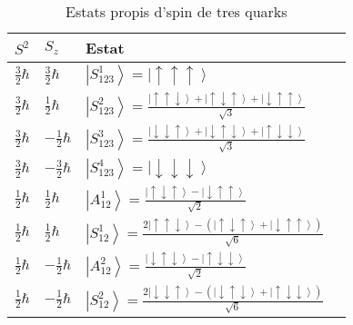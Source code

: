 \documentclass[12pt]{article}
\numberwithin{table}{section}
\numberwithin{figure}{section}
\numberwithin{equation}{section}
\renewcommand{\up}{\uparrow}
\newcommand{\down}{\downarrow}
\newcommand{\ket}[1]{\left\vert {#1} \right\rangle}
\begin{document}
\begin{table}[htb]
	\centering \sffamily \small
	\caption{Estats propis d'spin de tres quarks}
	\label{tab:estats d'spin}
	\begin{tabular}{@{}llll@{}}
		\toprule
		\( S^2 \) & \( S_z \) & Estat \\
		\midrule	
		\( \tfrac{3}{2}\hbar \) & \( \tfrac{3}{2}\hbar \) & \( \ket{S_{123}^1} = \ket{\up\up\up} \) \\
		\( \tfrac{3}{2}\hbar \) & \( \tfrac{1}{2}\hbar \) & \( \ket{S_{123}^2} = \frac{\ket{\up\up\down} + \ket{\up\down\up} + \ket{\down\up\up}}{\sqrt{3}} \) \\
		\( \tfrac{3}{2}\hbar \) & \( -\tfrac{1}{2}\hbar \) & \( \ket{S_{123}^3} = \frac{\ket{\down\down\up} + \ket{\down\up\down} + \ket{\up\down\down}}{\sqrt{3}} \) \\
		\( \tfrac{3}{2}\hbar \) & \( -\tfrac{3}{2}\hbar \) & \( \ket{S_{123}^4} = \ket{\down\down\down} \) \\
		\( \tfrac{1}{2}\hbar \) & \( \tfrac{1}{2}\hbar \) & \( \ket{A_{12}^1} = \frac{\ket{\up\down\up} - \ket{\down\up\up}}{\sqrt{2}} \) \\
		\( \tfrac{1}{2}\hbar \) & \( \tfrac{1}{2}\hbar \) & \( \ket{S_{12}^1} = \frac{2\ket{\up\up\down} - (\ket{\up\down\up} + \ket{\down\up\up})}{\sqrt{6}} \) \\
		\( \tfrac{1}{2}\hbar \) & \( -\tfrac{1}{2}\hbar \) & \( \ket{A_{12}^2} = \frac{\ket{\down\up\down} - \ket{\up\down\down}}{\sqrt{2}} \) \\
		\( \tfrac{1}{2}\hbar \) & \( -\tfrac{1}{2}\hbar \) & \( \ket{S_{12}^2} = \frac{2\ket{\down\down\up} - (\ket{\down\up\down} + \ket{\up\down\down})}{\sqrt{6}} \) \\
		\bottomrule
	\end{tabular}
\end{table}
\end{document}
